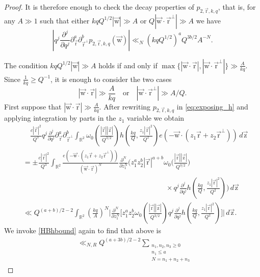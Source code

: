 \documentclass[letterpaper,11pt]{amsart}
\numberwithin{equation}{section}
\theoremstyle{definition}
\numberwithin{equation}{section}
\newcommand{\ur}{\vec{\mathrm{r}}}
\newcommand{\uz}{{\vec{\mathrm{z}}}}
\newcommand{\uw}{{\vec{\mathrm{w}}}}
\newcommand{\N}{\mathbb{N}}
\newcommand{\R}{\mathbb{R}}
\begin{document}
\begin{proof}
It is therefore enough to check the decay properties of $p_{2,\ur,k,q}$, that is, for any $A\gg 1$ such that either $kqQ^{1/2}|\uw|\gg A$ or $Q|\uw\cdot\ur^\perp|\gg A$ we have
\begin{equation*}
|
q^j\frac{\partial^j}{\partial q^j}
\partial_{\ur }^a
\partial_{\ur ^\perp}^b
p_{2,\ur,k,q}(\uw)|\ll_N
\left(kqQ^{1/2}\right)^a Q^{3b/2} 
A^{-N}.
\end{equation*}


The condition $kqQ^{1/2}|\uw|\gg A$ holds if and only if  $\max\{|\uw\cdot\ur|, |\uw\cdot\ur^\perp|\} \gg \frac{A}{kq} $. Since $ \frac{1}{kq} \geq Q^{-1}$, it is enough to consider the two cases
\begin{equation*}
|\uw\cdot\ur|\gg \frac{A}{kq}\,\,\,\,\,\,\textrm{or} \,\,\,\,\,\,|\uw\cdot\ur^\perp|\gg A/Q.
\end{equation*}
First suppose that $|\uw\cdot\ur|\gg \frac{A}{kq}$. 
After rewriting $p_{2,\ur,k,q}$ in \eqref{eq:exposing_h}  and applying integration by parts in the \(z_1\) variable  we obtain 
	\begin{align*}		
		&\quad \frac{c|\ur|^2}{Q^3}
		q^j\frac{\partial^j}{\partial q^j}
		\partial_{\ur }^a
		\partial_{\ur ^\perp}^b
		\int_{\R^2}
\omega_0\left(\frac{|\ur||\uz|}{Q^{3/2}}\right)
h\left(
\frac{kq}{Q},
\frac{z_1|\ur|^2 }{ Q^2}
\right)
e(-\uw\cdot (z_1\ur+z_2\ur^\perp))
\,d\uz
		\\
	&=\pm\frac{c|\ur|^2}{Q^3}
	\int_{\R^2}
	\frac{e(-\uw\cdot (z_1\ur+z_2\ur^\perp))
	}{(\uw\cdot\ur)^N}
	\frac{\partial^N}{\partial z_1^N}
	\Big(
	z_1^a z_2^b|\ur|^{a+b}
	\omega_0\big(\frac{|\ur||\uz|}{Q^{3/2}}\big)	\\ & \quad \quad \quad \quad \quad \quad\quad \quad \quad  \quad \quad \quad\quad \quad \quad\quad \quad \quad\quad \quad 	\times q^j\frac{\partial^j}{\partial q^j}
	h\left(
	\frac{kq}{Q},
	\frac{z_1|\ur|^2 }{ Q^2}
	\right)\Big)
	\,d\uz
	\\
		&\ll 
Q^{(a+b)/2-2}
	\int_{\R^2}
	\left(
	\frac{kq}{A}
	\right)^N\Big|
	\frac{\partial^N}{\partial z_1^N}
	\big[
	z_1^a z_2^b
	\omega_0\left(\frac{|\ur||\uz|}{Q^{3/2}}\right)	q^j\frac{\partial^j}{\partial q^j}
	h\left(
	\frac{kq}{Q},
	\frac{z_1|\ur|^2 }{ Q^2}
	\right)\big]\Big|
	\,d\uz.
	\end{align*}
We  invoke \eqref{HBhbound} again to find that above is
	\begin{align*}
		&
		\ll_{N,R}
	Q^{(a+3b)/2-2}
	\sum_{\substack{ n_1,n_2,n_3\geq 0 \\ n_1\leq a \\N=n_1+n_2+n_3 }}

\end{align*}
\end{proof}
\end{document}
